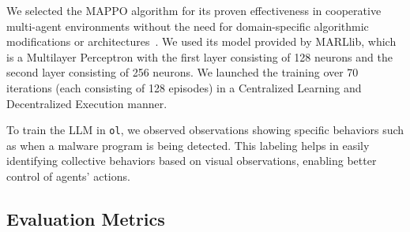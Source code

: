 \documentclass[conference]{IEEEtran}
\begin{document}
We selected the MAPPO algorithm for its proven effectiveness in cooperative multi-agent environments without the need for domain-specific algorithmic modifications or architectures~\cite{Yu2022}. We used its model provided by MARLlib, which is a Multilayer Perceptron with the first layer consisting of 128 neurons and the second layer consisting of 256 neurons. We launched the training over 70 iterations (each consisting of 128 episodes) in a Centralized Learning and Decentralized Execution manner.

To train the LLM in \texttt{ol}, we observed observations showing specific behaviors such as when a malware program is being detected. This labeling helps in easily identifying collective behaviors based on visual observations, enabling better control of agents' actions.

\subsection{Evaluation Metrics}
\end{document}
